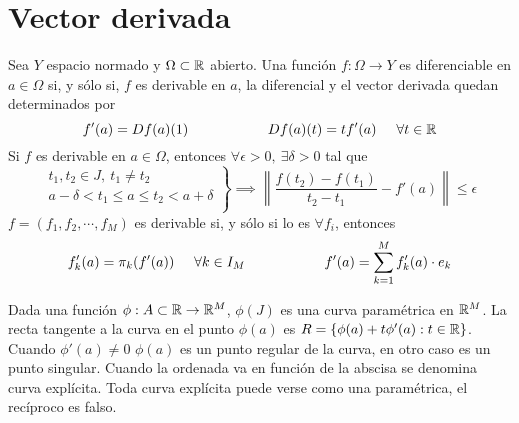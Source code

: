 \section{Vector derivada}
Sea $Y$ espacio normado y $\Omega\subset\mathbb{R}$ abierto. Una función $f:\Omega\rightarrow Y$ es diferenciable en $a\in\Omega$ si, y sólo si, $f$ es derivable en $a$, la diferencial y el vector derivada quedan determinados por
$$ f'(a) = Df(a)(1)\hspace{2cm} Df(a)(t) = tf'(a)\hspace{0.5cm} \forall t\in\mathbb{R} $$
Si $f$ es derivable en $a\in\Omega$, entonces $\forall\epsilon>0,\ \exists\delta>0$ tal que
$$ \left.
	\begin{array}{l}
		t_1,t_2\in J,\ t_1\not =t_2 \\
		a-\delta<t_1\leq a\leq t_2<a+\delta \\
	\end{array} \right\}
\implies
\left\|
\frac{f(t_2)-f(t_1)}{t_2-t_1} -f'(a)\right\| \leq\epsilon
$$
$f=(f_1,f_2,\cdots,f_M)$ es derivable si, y sólo si lo es $\forall f_i$, entonces
$$ f_k'(a) = \pi_k(f'(a))\hspace{0.5cm}\forall k\in I_M\hspace{2cm} 
f'(a) = \sum_{k=1}^{M} f_k'(a)\cdot e_k$$

Dada una función $\phi:A\subset\mathbb{R}\rightarrow\mathbb{R}^M$, $\phi (J)$ es una curva paramétrica en $\mathbb{R}^M$. 
La recta tangente a la curva en el punto $\phi (a)$ es $R=\{ \phi(a)+t\phi'(a) : t\in\mathbb{R} \}$.
Cuando $\phi'(a)\not=0$ $\phi(a)$ es un punto regular de la curva, en otro caso es un punto singular.
Cuando la ordenada va en función de la abscisa se denomina curva explícita.
Toda curva explícita puede verse como una paramétrica, el recíproco es falso.